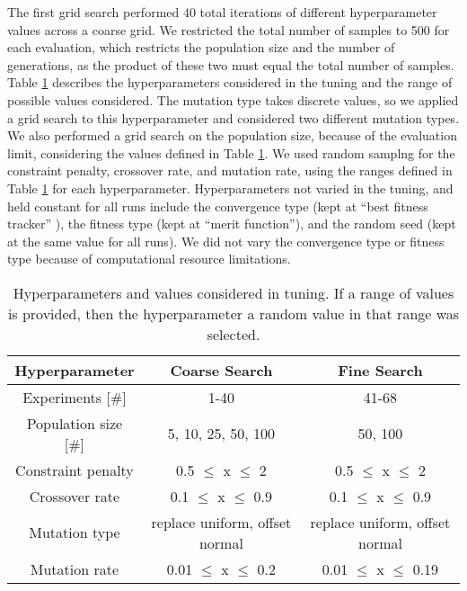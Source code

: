 The 
first grid search performed 40 total iterations of different hyperparameter 
values across a coarse grid. We restricted the total number of samples to 
500 for each evaluation, which restricts the population size and the 
number of generations, as the product of these two must equal the 
total number of samples. Table \ref{tab:soga_tuning} describes 
the hyperparameters considered in the tuning and the range of possible 
values considered. The mutation type takes discrete values, so 
we applied a grid search to this hyperparameter and considered 
two different mutation types. We also performed a grid 
search on the population size, because of the evaluation limit, 
considering the values defined in Table \ref{tab:soga_tuning}. 
We used random samplng for the constraint penalty, crossover 
rate, and mutation rate, using the ranges defined in Table 
\ref{tab:soga_tuning} for each hyperparameter. Hyperparameters 
not varied in the tuning, and 
held constant for all runs include the convergence type (kept at
``best fitness tracker'' ), the fitness type (kept at ``merit function''),
and the random seed (kept at the same value for all runs). We did 
not vary the convergence type or fitness type because of computational 
resource limitations. 

\begin{table}[h!]
    \centering 
    \caption{Hyperparameters and values considered in tuning. If a range 
    of values is provided, then the hyperparameter a random value in 
    that range was selected.}
    \label{tab:soga_tuning}
    \begin{tabular}{c c c}
        \hline
        Hyperparameter & Coarse Search & Fine Search \\
        \hline 
        Experiments [\#] & 1-40 & 41-68 \\
        Population size [\#] & 5, 10, 25, 50, 100 & 50, 100\\
        Constraint penalty & 0.5 $\leq$ x $\leq$ 2 & 0.5 $\leq$ x $\leq$ 2\\
        Crossover rate & 0.1 $\leq$ x $\leq$ 0.9 & 0.1 $\leq$ x $\leq$ 0.9\\
        Mutation type & replace uniform, offset normal & replace uniform, offset normal\\
        Mutation rate & 0.01 $\leq$ x $\leq$ 0.2 & 0.01 $\leq$ x $\leq$ 0.19\\
        \hline       
    \end{tabular}
\end{table}

